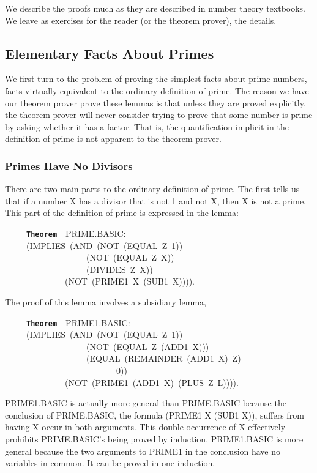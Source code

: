 \documentclass[11pt]{book}
\newenvironment{pubasis}{\begin{flushleft}\ttfamily\small}{\normalsize\rmfamily\end{flushleft}}
\newcommand{\axiomordefinition}[1]{\vspace{6pt}\texttt{\textbf{#1}}}
\newcommand{\pubdefaulttextsize}{\large}
\begin{document}
We  describe the proofs much as they are described in number
theory textbooks.  We leave as exercises for the reader (or the theorem
prover), the details.
\subsection{Elementary Facts About Primes}
\label{SSSELEMENTARYFACTSABOUTPRIMES}
\pubdefaulttextsize
We first turn to the problem of proving the simplest
facts about prime numbers, facts virtually
equivalent to the ordinary definition of prime.
The reason we  have our theorem prover 
prove these lemmas is that unless they are  proved explicitly,
the theorem prover will  never consider 
trying to prove that some number is prime  by asking
whether it has  a factor.  That is, the quantification
implicit in the definition of prime is not apparent
to the theorem prover.  
\subsubsection{Primes Have No Divisors}
\pubdefaulttextsize
There are two main parts to the ordinary definition of
prime.  The first tells us that if a number X has a divisor
that is not 1 and not X, then X is not a prime.  This
part of the definition of prime is expressed in the
lemma:
\begin{pubasis}
~~~~~\axiomordefinition{Theorem}~~PRIME.BASIC:\\
~~~~~(IMPLIES~(AND~(NOT~(EQUAL~Z~1))\\
~~~~~~~~~~~~~~~~~~~(NOT~(EQUAL~Z~X))\\
~~~~~~~~~~~~~~~~~~~(DIVIDES~Z~X))\\
~~~~~~~~~~~~~~(NOT~(PRIME1~X~(SUB1~X)))).\\
\end{pubasis}
The proof of this lemma involves a subsidiary lemma,
\begin{pubasis}
~~~~~\axiomordefinition{Theorem}~~PRIME1.BASIC:\\
~~~~~(IMPLIES~(AND~(NOT~(EQUAL~Z~1))\\
~~~~~~~~~~~~~~~~~~~(NOT~(EQUAL~Z~(ADD1~X)))\\
~~~~~~~~~~~~~~~~~~~(EQUAL~(REMAINDER~(ADD1~X)~Z)\\
~~~~~~~~~~~~~~~~~~~~~~~~~~0))\\
~~~~~~~~~~~~~~(NOT~(PRIME1~(ADD1~X)~(PLUS~Z~L)))).\\
\end{pubasis}
PRIME1.BASIC is actually more general than  PRIME.BASIC
because the conclusion of PRIME.BASIC,  the
formula (PRIME1 X (SUB1 X)),  suffers from having
X occur in both arguments.  This double occurrence
of X effectively prohibits PRIME.BASIC's being 
proved by induction.  PRIME1.BASIC is more general
because the two arguments to PRIME1 in the conclusion
have no variables in common.  It can be proved in one induction.
\end{document}
